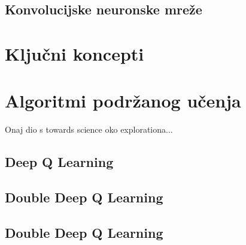 \subsection{Konvolucijske neuronske mreže}

\section{Ključni koncepti}


\section{Algoritmi podržanog učenja}

Onaj dio s towards science oko explorationa...



\subsection{Deep Q Learning}
\subsection{Double Deep Q Learning}
\subsection{Double Deep Q Learning}

